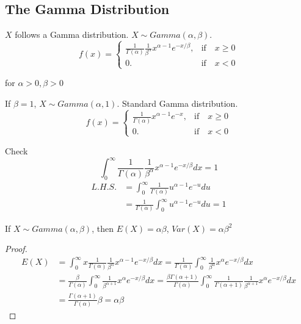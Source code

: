 \subsection{The Gamma Distribution}
\begin{defn}
$X$ follows a Gamma distribution. $X \sim Gamma(\alpha,\beta)$.
\[f(x)=\begin{cases}
\frac{1}{\Gamma(\alpha)} \frac{1}{\beta^{\alpha}} x^{\alpha-1} e^{-x/\beta}, & \text{if} \quad x\geq 0\\
0. & \text{if} \quad x < 0
\end{cases}\]

for $\alpha>0, \beta>0$
\end{defn}

If $\beta=1$, $X \sim Gamma(\alpha,1)$. Standard Gamma distribution.
\[f(x)=\begin{cases}
\frac{1}{\Gamma(\alpha)}  x^{\alpha-1} e^{-x}, & \text{if} \quad x\geq 0\\
0. & \text{if} \quad x < 0
\end{cases}\]

Check
\[\int_{0}^{\infty}\frac{1}{\Gamma(\alpha)}  \frac{1}{\beta^{\alpha}} x^{\alpha-1} e^{-x/\beta} dx=1\]
\begin{align*}
L.H.S.&=\int_{0}^{\infty}\frac{1}{\Gamma(\alpha)}   u^{\alpha-1} e^{-u} du \\
&=\frac{1}{\Gamma(\alpha)} \int_{0}^{\infty} u^{\alpha-1} e^{-u} du=1
\end{align*}

\begin{prop}
If $X\sim Gamma(\alpha,\beta)$, then $E(X)=\alpha\beta$, $Var(X)=\alpha\beta^2$
\begin{proof}
\begin{align*}
E(X)&=\int_{0}^{\infty}x \frac{1}{\Gamma(\alpha)} \frac{1}{\beta^{\alpha}} x^{\alpha-1} e^{-x/\beta} dx = \frac{1}{\Gamma(\alpha)} \int_{0}^{\infty} \frac{1}{\beta^{\alpha}} x^{\alpha} e^{-x/\beta} dx  \\
&=\frac{\beta}{\Gamma(\alpha)} \int_{0}^{\infty} \frac{1}{\beta^{\alpha+1}} x^{\alpha} e^{-x/\beta} dx =  \frac{\beta \Gamma(\alpha+1)}{\Gamma(\alpha)} \int_{0}^{\infty}\frac{1}{\Gamma(\alpha+1)}  \frac{1}{\beta^{\alpha+1}} x^{\alpha} e^{-x/\beta} dx \\
&=\frac{\Gamma(\alpha+1)}{\Gamma(\alpha)}\beta =\alpha\beta
\end{align*}
\end{proof}
\end{prop}

